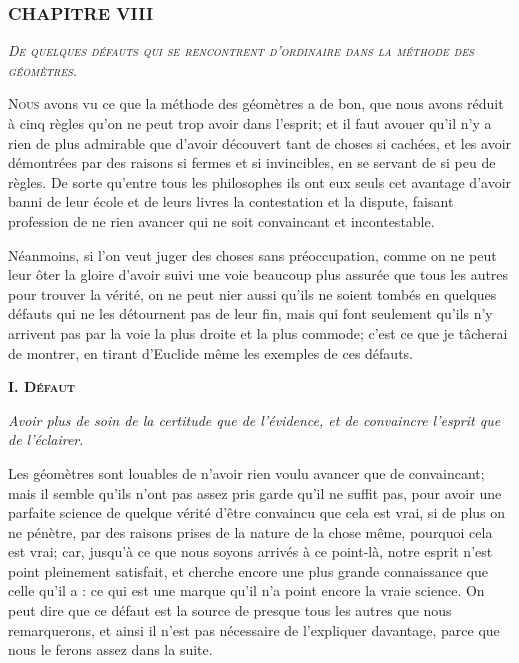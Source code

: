 \subsubsection{\centering \Large CHAPITRE VIII}
\begin{center}\emph{\large\scshape De quelques défauts qui se rencontrent d'ordinaire dans la méthode des géomètres.}\end{center}

	\lettrine{N}{ous} avons vu ce que la méthode des géomètres a de bon, que nous avons réduit à cinq règles qu'on ne peut trop avoir dans l'esprit; et il faut avouer qu'il n'y a rien de plus admirable que d'avoir découvert tant de choses si cachées, et les avoir démontrées par des raisons si fermes et si invincibles, en se servant de si peu de règles. De sorte qu'entre tous les philosophes ils ont eux seuls cet avantage d'avoir banni de leur école et de leurs livres la contestation et la dispute, faisant profession de ne rien avancer qui ne soit convaincant et incontestable.

Néanmoins, si l'on veut juger des choses sans préoccupation, comme on ne peut leur ôter la gloire d'avoir suivi une voie beaucoup plus assurée que tous les autres pour trouver la vérité, on ne peut nier aussi qu'ils ne soient tombés en quelques défauts qui ne les détournent pas de leur fin, mais qui font seulement qu'ils n'y arrivent pas par la voie la plus droite et la plus commode; c'est ce que je tâcherai de montrer, en tirant d'Euclide même les exemples de ces défauts.

\begin{center}{\bfseries\scshape I. Défaut}\end{center}

	\emph{Avoir plus de soin de la certitude que de l'évidence, et de convaincre l'esprit que de l'éclairer}.

Les géomètres sont louables de n'avoir rien voulu avancer que de convaincant; mais il semble qu'ils n'ont pas assez pris garde qu'il ne suffit pas, pour avoir une parfaite science de quelque vérité d'être convaincu que cela est vrai, si de plus on ne pénètre, par des raisons prises de la nature de la chose même, pourquoi cela est vrai; car, jusqu'à ce que nous soyons arrivés à ce point-là, notre esprit n'est point pleinement satisfait, et cherche encore une plus grande connaissance que celle qu'il a : ce qui est une marque qu'il n'a point encore la vraie science. On peut dire que ce défaut est la source de presque tous les autres que nous remarquerons, et ainsi il n'est pas nécessaire de l'expliquer davantage, parce que nous le ferons assez dans la suite.

